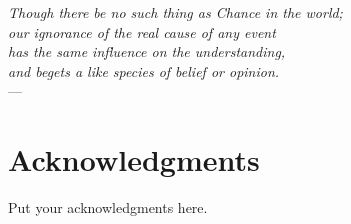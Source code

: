 
\begin{flushright}{\slshape    
Though there be no such thing as Chance in the world; \\
our ignorance of the real cause of any event \\
has the same influence on the understanding, \\
and begets a like species of belief or opinion.} \\ \medskip
    --- 
\end{flushright}



\bigskip

\begingroup
\let\clearpage\relax
\let\cleardoublepage\relax
\let\cleardoublepage\relax
\chapter*{Acknowledgments}
Put your acknowledgments here.

\endgroup



